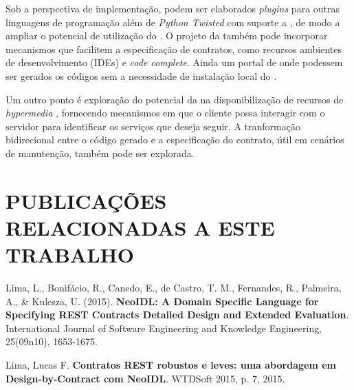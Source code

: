 Sob a perspectiva de implementação, podem ser elaborados \textit{plugins} para
outras linguagens de programação além de \textit{Python Twisted} com suporte a
\designbycontract{}, de modo a ampliar o potencial de utilização do
\framework{}. O projeto da \neoidl{} também pode incorporar mecanismos que
facilitem a especificação de contratos, como recursos ambientes
de desenvolvimento (IDEs) e \textit{code complete}. Ainda um portal de onde
podessem ser gerados os códigos sem a necessidade de instalação local do
\framework{}.

Um outro ponto é exploração do potencial da \neoidl{} na disponibilização de
recursos de \textit{hypermedia} \cite{webber2010rest}, fornecendo mecanismos
em que o cliente possa interagir com o servidor para identificar os serviços
que deseja seguir. A tranformação bidirecional entre o código gerado e a
especificação do contrato, útil em cenários de manutenção, também pode ser
explorada.

\section{PUBLICAÇÕES RELACIONADAS A ESTE TRABALHO}
\vspace{-6mm}

Lima, L., Bonifácio, R., Canedo, E., de Castro, T. M., Fernandes, R., Palmeira,
A., \& Kulesza, U. (2015). \textbf{NeoIDL: A Domain Specific Language for
Specifying REST Contracts Detailed Design and Extended Evaluation}.
International Journal of Software Engineering and Knowledge Engineering, 25(09n10), 1653-1675.

Lima, Lucas F. \textbf{Contratos REST robustos e leves: uma abordagem em
Design-by-Contract com NeoIDL}. WTDSoft 2015, p. 7, 2015.

